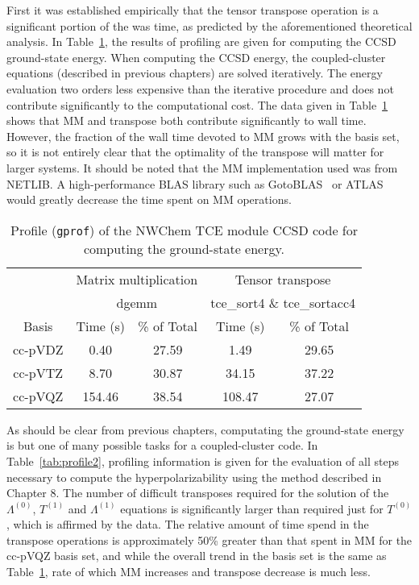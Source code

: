 \documentclass[aps,preprint,groupedaddress]{revtex4-1}
\begin{document}
First it was established empirically that the tensor transpose operation is a significant portion of the was time, as predicted by the aforementioned theoretical analysis.  In Table~\ref{tab:profile1}, the results of profiling are given for computing the CCSD ground-state energy.  When computing the CCSD energy, the coupled-cluster equations (described in previous chapters) are solved iteratively.  The energy evaluation two orders less expensive than the iterative procedure and does not contribute significantly to the computational cost.  The data given in Table~\ref{tab:profile1} shows that MM and transpose both contribute significantly to wall time.  However, the fraction of the wall time devoted to MM grows with the basis set, so it is not entirely clear that the optimality of the transpose will matter for larger systems.  It should be noted that the MM implementation used was from NETLIB.  A high-performance BLAS library such as GotoBLAS~\cite{GotoBLAS} or ATLAS~\cite{ATLAS} would greatly decrease the time spent on MM operations.

\begin{table}[!hp]
\caption{Profile (\texttt{gprof}) of the NWChem TCE module CCSD code for computing the ground-state energy.} \label{tab:profile1}
\begin{tabular}{ccccc}
\hline\hline
& \multicolumn{2}{c}{Matrix multiplication} & \multicolumn{2}{c}{Tensor transpose} \\
 & \multicolumn{2}{c}{dgemm} & \multicolumn{2}{c}{tce\_sort4 \& tce\_sortacc4} \\
   \cline{2-3} \cline{4-5}
Basis & Time (s) & \% of Total & Time (s) & \% of Total \\
\hline
cc-pVDZ &   0.40 & 27.59 &   1.49 & 29.65 \\
cc-pVTZ &   8.70 & 30.87 &  34.15 & 37.22 \\
cc-pVQZ & 154.46 & 38.54 & 108.47 & 27.07 \\
\hline\hline
\end{tabular}
\end{table}

As should be clear from previous chapters, computating the ground-state energy is but one of many possible tasks for a coupled-cluster code.  In Table~\ref{tab:profile2}, profiling information is given for the evaluation of all steps necessary to compute the hyperpolarizability using the method described in Chapter 8.  The number of difficult transposes required for the solution of the $\Lambda^{(0)}$, $T^{(1)}$ and $\Lambda^{(1)}$ equations is significantly larger than required just for $T^{(0)}$, which is affirmed by the data.  The relative amount of time spend in the transpose operations is approximately 50\% greater than that spent in MM for the cc-pVQZ basis set, and while the overall trend in the basis set is the same as Table~\ref{tab:profile1}, rate of which MM increases and transpose decrease is much less.
\end{document}
